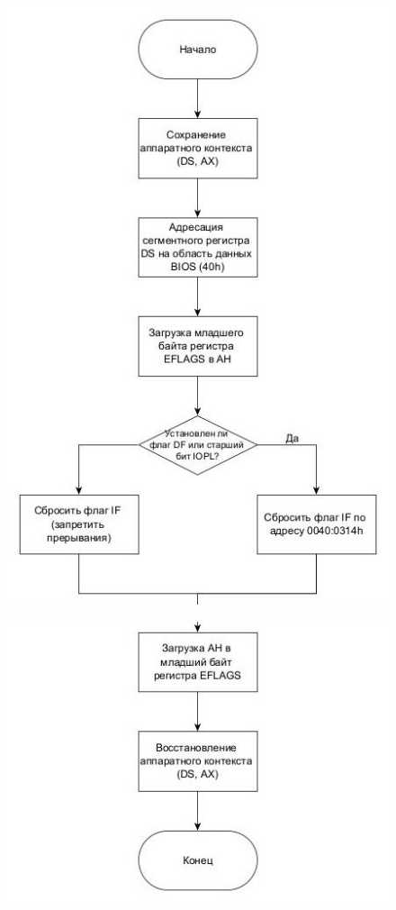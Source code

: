 \begin{figure}[!ht]
    \begin{center}
        \includegraphics[width=12cm]{img/int8h.sub_1.1}
    \end{center}
\end{figure}

\clearpage
\newpage

\begin{figure}[!ht]
    \begin{center}
        \includegraphics[width=12cm]{img/int8h.sub_1.2}
    \end{center}
\end{figure}